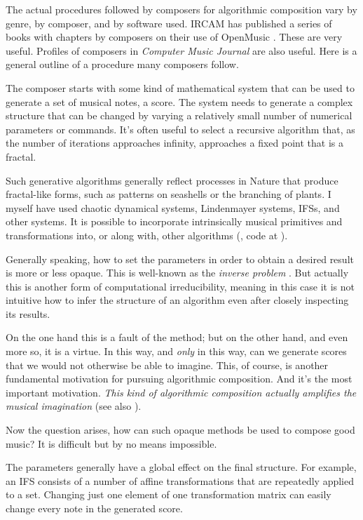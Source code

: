 \documentclass[]{interact}
\theoremstyle{plain}%
\theoremstyle{definition}
\theoremstyle{remark}
\begin{document}
The actual procedures followed by composers for algorithmic composition vary by genre, by composer, and by software used. IRCAM has published a series of books with chapters by composers on their use of OpenMusic \citep{omcomposersbook, agon2006om, agon2008om, agon2016om}. These are very useful. Profiles of composers in \emph{Computer Music Journal} are also useful. Here is a general outline of a procedure many composers follow.

The composer starts with some kind of mathematical system that can be used to generate a set of musical notes, a score. The system needs to generate a complex structure that can be changed by varying a relatively small number of numerical parameters or commands. It’s often useful to select a recursive algorithm that, as the number of iterations approaches infinity, approaches a fixed point that is a fractal. 

Such generative algorithms generally reflect processes in Nature that produce fractal-like forms, such as patterns on seashells or the branching of plants. I myself have used chaotic dynamical systems, Lindenmayer systems, IFSs, and other systems. It is possible to incorporate intrinsically musical primitives and transformations into, or along with, other algorithms (\citet{Anonymous2020}, code at \citet{Anonymous2025Code}).

Generally speaking, how to set the parameters in order to obtain a desired result is more or less opaque. This is well-known as the \emph{inverse problem} \citep{graham2021applying, tu2023learning}. But actually this is another form of computational irreducibility, meaning in this case it is not intuitive how to infer the structure of an algorithm even after closely inspecting its results. 

On the one hand this is a fault of the method; but on the other hand, and even more so, it is a virtue. In this way, and \emph{only} in this way, can we generate scores that we would not otherwise be able to imagine. This, of course, is another fundamental motivation for pursuing algorithmic composition. And it's the most important motivation. \emph{This kind of algorithmic composition actually amplifies the musical imagination} (see also \citet{edwards2011algorithmic}).

Now the question arises, how can such opaque methods be used to compose good music? It is difficult but by no means impossible.

The parameters generally have a global effect on the final structure. For example, an IFS consists of a number of affine transformations that are repeatedly applied to a set. Changing just one element of one transformation matrix can easily change every note in the generated score.
\end{document}
